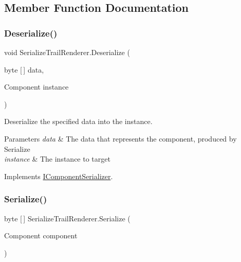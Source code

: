 \subsection{Member Function Documentation}
\mbox{\label{class_serialize_trail_renderer_a9be87b05372daa6150e8e4522fa97568}} 
\subsubsection{\texorpdfstring{Deserialize()}{Deserialize()}}
{\footnotesize\ttfamily void Serialize\+Trail\+Renderer.\+Deserialize (\begin{DoxyParamCaption}\item[{byte \mbox{[}$\,$\mbox{]}}]{data,  }\item[{Component}]{instance }\end{DoxyParamCaption})\hspace{0.3cm}{\ttfamily [inline]}}



Deserialize the specified data into the instance. 


\begin{DoxyParams}{Parameters}
{\em data} & The data that represents the component, produced by Serialize \\
\hline
{\em instance} & The instance to target \\
\hline
\end{DoxyParams}


Implements \hyperlink{interface_i_component_serializer_a4cc366a5c78b33d47a90c209d8fed883}{I\+Component\+Serializer}.

\mbox{\label{class_serialize_trail_renderer_ab7177e5b5343bff3444f014b3a1f88de}} 
\subsubsection{\texorpdfstring{Serialize()}{Serialize()}}
{\footnotesize\ttfamily byte \mbox{[}$\,$\mbox{]} Serialize\+Trail\+Renderer.\+Serialize (\begin{DoxyParamCaption}\item[{Component}]{component }\end{DoxyParamCaption})\hspace{0.3cm}{\ttfamily [inline]}}



